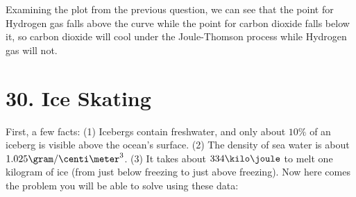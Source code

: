 \documentclass[a4paper,twoside]{article}
\begin{document}
\begin{itemize}
\begin{problem}
            Examining the plot from the previous question, we can see that the point for Hydrogen gas falls above the curve while the point for carbon dioxide falls below it, so carbon dioxide will cool under the Joule-Thomson process while Hydrogen gas will not.
        \end{problem}
\end{itemize}


\section*{30. Ice Skating}
First, a few facts: (1) Icebergs contain freshwater, and only about $ 10\% $ of an iceberg is visible above the ocean's surface. (2) The density of sea water is about $ 1.025\gram/\centi\meter^3 $. (3) It takes about $ 334\kilo\joule $ to melt one kilogram of ice (from just below freezing to just above freezing). Now here comes the problem you will be able to solve using these data:
\end{document}
